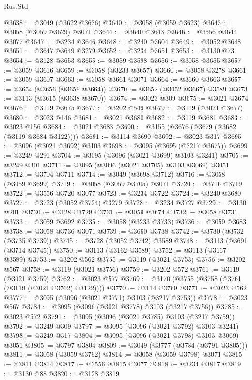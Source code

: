 \begin{lexlean}{RustStd}
\begin{coremodule}
@3638 := @3049 (@3622 @3636)
@3640 := @3058 (@3059 @3623)
@3643 := @3058 (@3059 @3629) @3071
@3644 := @3640 @3643
@3646 := @3556 @3644 @3077
@3647 := @3234 @3646
@3648 := @3240 @3604
@3649 := @3052 @3648
@3651 := @3647 @3649 @3279
@3652 := @3234 @3651
@3653 := @3130 @73
@3654 := @3128 @3653
@3655 := @3059 @3598
@3656 := @3058 @3655
@3657 := @3059 @3616
@3659 := @3058 (@3233 @3657)
@3660 := @3058 @3278
@3661 := @3059 @3607
@3663 := @3058 @3661 @3071
@3664 := @3660 @3663
@3667 := @3654 (@3656 (@3659 @3664))
@3670 := @3652 (@3052 @3667) @3589
@3673 := @3113 (@3615 (@3638 @3670))
@3674 := @3023 @309
@3675 := @3021 @3674
@3676 := @3119 @3675
@3677 := @3202 @549
@3679 := @3119 (@3021 @3677)
@3680 := @3023 @146
@3681 := @3021 @3680
@3682 := @3119 @3681
@3683 := @3023 @156
@3684 := @3021 @3683
@3690 := @3155 (@3676 (@3679 (@3682 (@3119 @3684 @3122))))
@3691 := @3114 @3690
@3692 := @3023 @317
@3695 := @3096 (@3021 @3692) @3103
@3698 := @3095 (@3695 (@3217 @3677))
@3699 := @3249 @291
@3704 := @3095 (@3096 (@3021 @3699) @3103 @3241)
@3705 := @3249 @301
@3711 := @3095 (@3096 (@3021 @3705) @3103 @3069) @3051
@3712 := @3704 @3711
@3714 := @3049 (@3698 @3712)
@3716 := @3058 (@3059 @3699)
@3719 := @3058 (@3059 @3705) @3071
@3720 := @3716 @3719
@3722 := @3556 @3720 @3077
@3723 := @3234 @3722
@3724 := @3240 @3680
@3727 := @3723 (@3052 @3724) @3279
@3728 := @3234 @3727
@3729 := @3130 @201
@3730 := @3128 @3729
@3731 := @3059 @3674
@3732 := @3058 @3731
@3733 := @3059 @3692
@3735 := @3058 (@3233 @3733)
@3736 := @3059 @3683
@3738 := @3058 @3736 @3071
@3739 := @3660 @3738
@3742 := @3730 (@3732 (@3735 @3739))
@3745 := @3728 (@3052 @3742) @3589
@3748 := @3113 (@3691 (@3714 @3745))
@3750 := @3113 (@3162 @3589)
@3752 := @3113 (@3167 @3589)
@3753 := @3202 @562
@3755 := @3119 (@3021 @3753)
@3756 := @3202 @567
@3758 := @3119 (@3021 @3756)
@3759 := @3202 @572
@3761 := @3119 (@3021 @3759)
@3762 := @3023 @577
@3769 := @3170 (@3755 (@3758 (@3761 (@3119 (@3021 @3762) @3122))))
@3770 := @3114 @3769
@3771 := @3023 @562
@3777 := @3095 (@3096 (@3021 @3771) @3103 (@3217 @3753))
@3778 := @3023 @567
@3784 := @3095 (@3096 (@3021 @3778) @3103 (@3217 @3756))
@3785 := @3023 @572
@3791 := @3095 (@3096 (@3021 @3785) @3103 (@3217 @3759))
@3792 := @3249 @309
@3797 := @3095 (@3096 (@3021 @3792) @3103 @3241)
@3798 := @3249 @317
@3804 := @3095 (@3096 (@3021 @3798) @3103 @3069) @3051
@3805 := @3797 @3804
@3809 := @3049 (@3777 (@3784 (@3791 @3805)))
@3811 := @3058 (@3059 @3792)
@3814 := @3058 (@3059 @3798) @3071
@3815 := @3811 @3814
@3817 := @3556 @3815 @3077
@3818 := @3234 @3817
@3819 := @3130 @88
@3820 := @3128 @3819

\end{coremodule}
\end{lexlean}
